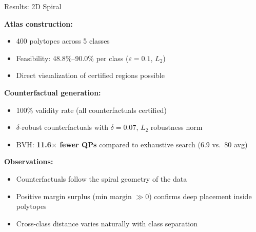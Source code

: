 \documentclass[aspectratio=169, 10pt]{beamer}
\begin{document}
\begin{frame}{Results: 2D Spiral}

\textbf{Atlas construction:}
\begin{itemize}
  \item 400 polytopes across 5 classes
  \item Feasibility: 48.8\%--90.0\% per class ($\varepsilon=0.1$, $L_2$)
  \item Direct visualization of certified regions possible
\end{itemize}

\bigskip

\textbf{Counterfactual generation:}
\begin{itemize}
  \item 100\% validity rate (all counterfactuals certified)
  \item $\delta$-robust counterfactuals with $\delta = 0.07$, $L_2$ robustness norm
  \item BVH: \textbf{11.6$\times$ fewer QPs} compared to exhaustive search (6.9 vs.\ 80 avg)
\end{itemize}

\bigskip

\textbf{Observations:}
\begin{itemize}
  \item Counterfactuals follow the spiral geometry of the data
  \item Positive margin surplus (min margin $\gg 0$) confirms deep placement inside polytopes
  \item Cross-class distance varies naturally with class separation
\end{itemize}

\end{frame}
\end{document}
